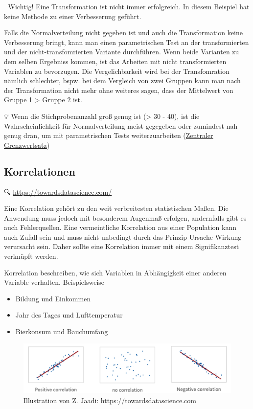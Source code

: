 \documentclass[
]{article}
\providecommand{\tightlist}{%
  \setlength{\itemsep}{0pt}\setlength{\parskip}{0pt}}
\begin{document}
🚨 Wichtig! Eine Transformation ist nicht immer erfolgreich. In diesem Beispiel hat keine Methode zu einer Verbesserung geführt.

Falls die Normalverteilung nicht gegeben ist und auch die Transformation keine Verbesserung bringt, kann man einen parametrischen Test an der transformierten und der nicht-transfomrierten Variante durchführen. Wenn beide Varianten zu dem selben Ergebniss kommen, ist das Arbeiten mit nicht transformierten Variablen zu bevorzugen. Die Vergelichbarkeit wird bei der Transfomration nämlich schlechter, bspw. bei dem Vergleich von zwei Gruppen kann man nach der Transformation nicht mehr ohne weiteres sagen, dass der Mittelwert von Gruppe 1 \textgreater{} Gruppe 2 ist.

💡 Wenn die Stichprobenanzahl groß genug ist (\textgreater{} 30 - 40), ist die Wahrscheinlichkeit für Normalverteilung meist gegegeben oder zumindest nah genug dran, um mit parametrischen Tests weiterzuarbeiten (\href{https://de.wikipedia.org/wiki/Zentraler_Grenzwertsatz}{Zentraler Grenzwertsatz})

\hypertarget{korrelationen}{%
\subsection{Korrelationen}\label{korrelationen}}

🔍 \href{https://towardsdatascience.com/eveything-you-need-to-know-about-interpreting-correlations-2c485841c0b8}{https://towardsdatascience.com/}

Eine Korrelation gehört zu den weit verbreitesten statistischen Maßen. Die Anwendung muss jedoch mit besonderem Augenmaß erfolgen, andernfalls gibt es auch Fehlerquellen. Eine vermeintliche Korrelation aus einer Population kann auch Zufall sein und muss nicht unbedingt durch das Prinzip Ursache-Wirkung verursacht sein. Daher sollte eine Korrelation immer mit einem Signifikanztest verknüpft werden.

Korrelation beschreiben, wie sich Variablen in Abhängigkeit einer anderen Variable verhalten. Beispielsweise

\begin{itemize}
\tightlist
\item
  Bildung und Einkommen
\item
  Jahr des Tages und Lufttemperatur
\item
  Bierkonsum und Bauchumfang
\end{itemize}

\begin{figure}

{\centering \includegraphics[width=1\linewidth]{images/055} 

}

\caption{Illustration von Z. Jaadi: https://towardsdatascience.com}\label{fig:unnamed-chunk-263}
\end{figure}
\end{document}

